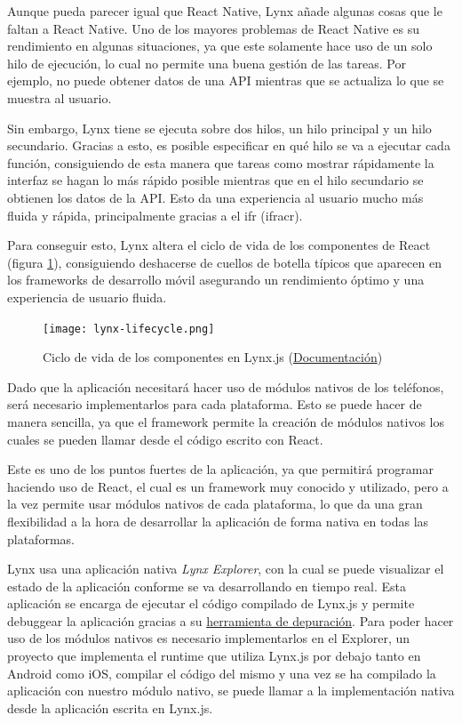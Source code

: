 Aunque pueda parecer igual que React Native, Lynx añade algunas cosas que le faltan a React Native. Uno de los mayores problemas de React Native es su rendimiento en algunas situaciones, ya que este solamente hace uso de un solo hilo de ejecución, lo cual no permite una buena gestión de las tareas. Por ejemplo, no puede obtener datos de una API mientras que se actualiza lo que se muestra al usuario.

Sin embargo, Lynx tiene se ejecuta sobre dos hilos, un hilo principal y un hilo secundario.
Gracias a esto, es posible especificar en qué hilo se va a ejecutar cada función, consiguiendo de esta manera que tareas como mostrar rápidamente la interfaz se hagan lo más rápido posible mientras que en el hilo secundario se obtienen los datos de la API.
Esto da una experiencia al usuario mucho más fluida y rápida, principalmente gracias a el \gls{ifr} (\acrshort{ifracr}).

Para conseguir esto, Lynx altera el ciclo de vida de los componentes de React (figura \ref{fig:lynx-component-lifecycle}), consiguiendo deshacerse de cuellos de botella típicos que aparecen en los frameworks de desarrollo móvil asegurando un rendimiento óptimo y una experiencia de usuario fluida.

\begin{figure}[h]
    \begin{center}
        \texttt{[image: lynx-lifecycle.png]}
    \end{center}
    \caption{Ciclo de vida de los componentes en Lynx.js (\href{https://lynxjs.org/react/lifecycle.html}{Documentación})}
    \label{fig:lynx-component-lifecycle}
\end{figure}


Dado que la aplicación necesitará hacer uso de módulos nativos de los teléfonos, será necesario implementarlos para cada plataforma.
Esto se puede hacer de manera sencilla, ya que el framework permite la creación de módulos nativos los cuales se pueden llamar desde el código escrito con React.

Este es uno de los puntos fuertes de la aplicación, ya que permitirá programar haciendo uso de React, el cual es un framework muy conocido y utilizado, pero a la vez permite usar módulos nativos de cada plataforma, lo que da una gran flexibilidad a la hora de desarrollar la aplicación de forma nativa en todas las plataformas.

Lynx usa una aplicación nativa \textit{Lynx Explorer}, con la cual se puede visualizar el estado de la aplicación conforme se va desarrollando en tiempo real.
Esta aplicación se encarga de ejecutar el código compilado de Lynx.js y permite debuggear la aplicación gracias a su \href{https://github.com/lynx-family/lynx-devtool}{herramienta de depuración}.
Para poder hacer uso de los módulos nativos es necesario implementarlos en el Explorer, un proyecto que implementa el runtime que utiliza Lynx.js por debajo tanto en Android como iOS, compilar el código del mismo y una vez se ha compilado la aplicación con nuestro módulo nativo, se puede llamar a la implementación nativa desde la aplicación escrita en Lynx.js.

